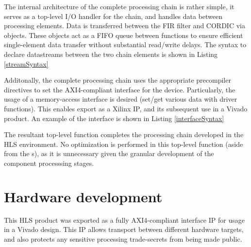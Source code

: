 \documentclass[11pt]{report}
\begin{document}
The internal architecture of the complete processing chain is rather simple, it serves as a top-level I/O handler for the chain, and handles data between processing elements. Data is transferred between the FIR filter and CORDIC via  objects. These objects act as a \ac{FIFO} queue between functions to ensure efficient single-element data transfer without substantial read/write delays. The syntax to declare datastreams between the two chain elements is shown in Listing \ref{streamSyntax}

        \begin{singlespace}
            
        \end{singlespace}

Additonally, the complete processing chain uses the appropriate precompiler directives to set the AXI4-compliant interface for the device. Particularly, the usage of a memory-access interface is desired (set/get various data with driver functions). This enables export as a Xilinx IP, and its subsequent use in a Vivado product. An example of the interface is shown in Listing \ref{interfaceSyntax}

        \begin{singlespace}
            
        \end{singlespace}
        
The resultant top-level function completes the processing chain developed in the HLS environment. No optimization is performed in this top-level function (aside from the s), as it is unnecessary given the granular development of the component processsing stages.

\section{Hardware development}\label{hwPackage}

This HLS product was exported as a fully AXI4-compliant interface IP for usage in a Vivado design. This IP allows transport between different hardware targets, and also protects any sensitive processing trade-secrets from being made public. 
\end{document}
